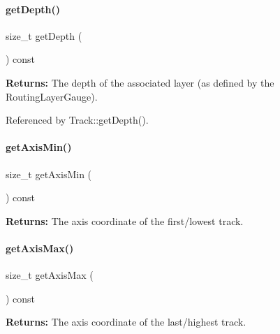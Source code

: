 \paragraph{\texorpdfstring{get\+Depth()}{getDepth()}}
{\footnotesize\ttfamily size\+\_\+t get\+Depth (\begin{DoxyParamCaption}{ }\end{DoxyParamCaption}) const\hspace{0.3cm}{\ttfamily [inline]}}

{\bfseries Returns\+:} The depth of the associated layer (as defined by the Routing\+Layer\+Gauge). 

Referenced by Track\+::get\+Depth().

\mbox{\label{classKite_1_1RoutingPlane_a9adcc1428480dd9a60454637c704207f}} 
\paragraph{\texorpdfstring{get\+Axis\+Min()}{getAxisMin()}}
{\footnotesize\ttfamily size\+\_\+t get\+Axis\+Min (\begin{DoxyParamCaption}{ }\end{DoxyParamCaption}) const\hspace{0.3cm}{\ttfamily [inline]}}

{\bfseries Returns\+:} The axis coordinate of the first/lowest track. \mbox{\label{classKite_1_1RoutingPlane_a1aa9568c234ed8b055c54f73c262690d}} 
\paragraph{\texorpdfstring{get\+Axis\+Max()}{getAxisMax()}}
{\footnotesize\ttfamily size\+\_\+t get\+Axis\+Max (\begin{DoxyParamCaption}{ }\end{DoxyParamCaption}) const\hspace{0.3cm}{\ttfamily [inline]}}

{\bfseries Returns\+:} The axis coordinate of the last/highest track. \mbox{\label{classKite_1_1RoutingPlane_afd185bba655c6f59e11b5652352cb902}} 
